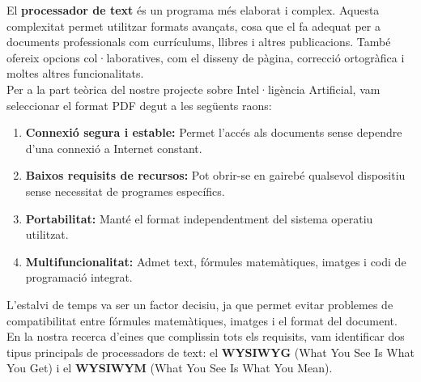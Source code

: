 El \textbf{processador de text} és un programa més elaborat i complex. Aquesta complexitat permet utilitzar formats avançats, cosa que el fa adequat per a documents professionals com currículums, llibres i altres publicacions. També ofereix opcions col·laboratives, com el disseny de pàgina, correcció ortogràfica i moltes altres funcionalitats.\\

Per a la part teòrica del nostre projecte sobre Intel·ligència Artificial, vam seleccionar el format PDF degut a les següents raons:
\begin{enumerate}
\item \textbf{Connexió segura i estable:} Permet l’accés als documents sense dependre d’una connexió a Internet constant.
\item \textbf{Baixos requisits de recursos:} Pot obrir-se en gairebé qualsevol dispositiu sense necessitat de programes específics.
\item \textbf{Portabilitat:} Manté el format independentment del sistema operatiu utilitzat.
\item \textbf{Multifuncionalitat:} Admet text, fórmules matemàtiques, imatges i codi de programació integrat.
\end{enumerate}

L’estalvi de temps va ser un factor decisiu, ja que permet evitar problemes de compatibilitat entre fórmules matemàtiques, imatges i el format del document.
En la nostra recerca d’eines que complissin tots els requisits, vam identificar dos tipus principals de processadors de text: el \textbf{WYSIWYG} (What You See Is What You Get) i el \textbf{WYSIWYM} (What You See Is What You Mean).


